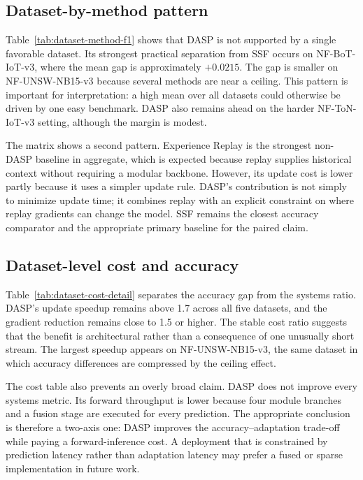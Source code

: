 

\subsection{Dataset-by-method pattern}
Table~\ref{tab:dataset-method-f1} shows that DASP is not supported by a single favorable dataset. Its strongest practical separation from SSF occurs on NF-BoT-IoT-v3, where the mean gap is approximately $+0.0215$. The gap is smaller on NF-UNSW-NB15-v3 because several methods are near a ceiling. This pattern is important for interpretation: a high mean over all datasets could otherwise be driven by one easy benchmark. DASP also remains ahead on the harder NF-ToN-IoT-v3 setting, although the margin is modest.

The matrix shows a second pattern. Experience Replay is the strongest non-DASP baseline in aggregate, which is expected because replay supplies historical context without requiring a modular backbone. However, its update cost is lower partly because it uses a simpler update rule. DASP's contribution is not simply to minimize update time; it combines replay with an explicit constraint on where replay gradients can change the model. SSF remains the closest accuracy comparator and the appropriate primary baseline for the paired claim.

\subsection{Dataset-level cost and accuracy}
Table~\ref{tab:dataset-cost-detail} separates the accuracy gap from the systems ratio. DASP's update speedup remains above 1.7 across all five datasets, and the gradient reduction remains close to 1.5 or higher. The stable cost ratio suggests that the benefit is architectural rather than a consequence of one unusually short stream. The largest speedup appears on NF-UNSW-NB15-v3, the same dataset in which accuracy differences are compressed by the ceiling effect.

The cost table also prevents an overly broad claim. DASP does not improve every systems metric. Its forward throughput is lower because four module branches and a fusion stage are executed for every prediction. The appropriate conclusion is therefore a two-axis one: DASP improves the accuracy--adaptation trade-off while paying a forward-inference cost. A deployment that is constrained by prediction latency rather than adaptation latency may prefer a fused or sparse implementation in future work.

